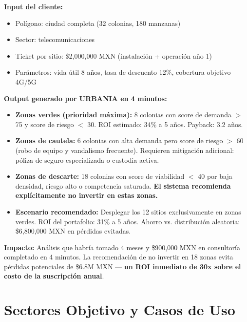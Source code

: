 \documentclass[12pt,a4paper]{article}
\begin{document}
\begin{tcolorbox}[cajanarrativa]
\textbf{Input del cliente:}
\begin{itemize}[leftmargin=0.5cm, itemsep=2pt]
  \item Polígono: ciudad completa (32 colonias, 180 manzanas)
  \item Sector: telecomunicaciones
  \item Ticket por sitio: \$2{,}000{,}000 MXN (instalación + operación año 1)
  \item Parámetros: vida útil 8 años, tasa de descuento 12\%, cobertura objetivo 4G/5G
\end{itemize}

\medskip
\textbf{Output generado por URBANIA en 4 minutos:}
\begin{itemize}[leftmargin=0.5cm, itemsep=2pt]
  \item \textbf{Zonas verdes (prioridad máxima):} 8 colonias con score de demanda $>$ 75 y score de riesgo $<$ 30. ROI estimado: 34\% a 5 años. Payback: 3.2 años.
  \item \textbf{Zonas de cautela:} 6 colonias con alta demanda pero score de riesgo $>$ 60 (robo de equipo y vandalismo frecuente). Requieren mitigación adicional: póliza de seguro especializada o custodia activa.
  \item \textbf{Zonas de descarte:} 18 colonias con score de viabilidad $<$ 40 por baja densidad, riesgo alto o competencia saturada. \textbf{El sistema recomienda explícitamente no invertir en estas zonas.}
  \item \textbf{Escenario recomendado:} Desplegar los 12 sitios exclusivamente en zonas verdes. ROI del portafolio: 31\% a 5 años. Ahorro vs. distribución aleatoria: \$6{,}800{,}000 MXN en pérdidas evitadas.
\end{itemize}

\medskip
\textbf{Impacto:} Análisis que habría tomado 4 meses y \$900{,}000 MXN en consultoría completado en 4 minutos. La recomendación de no invertir en 18 zonas evita pérdidas potenciales de \$6.8M MXN — \textbf{un ROI inmediato de 30x sobre el costo de la suscripción anual}.
\end{tcolorbox}


\newpage
\section{Sectores Objetivo y Casos de Uso}
\end{document}
